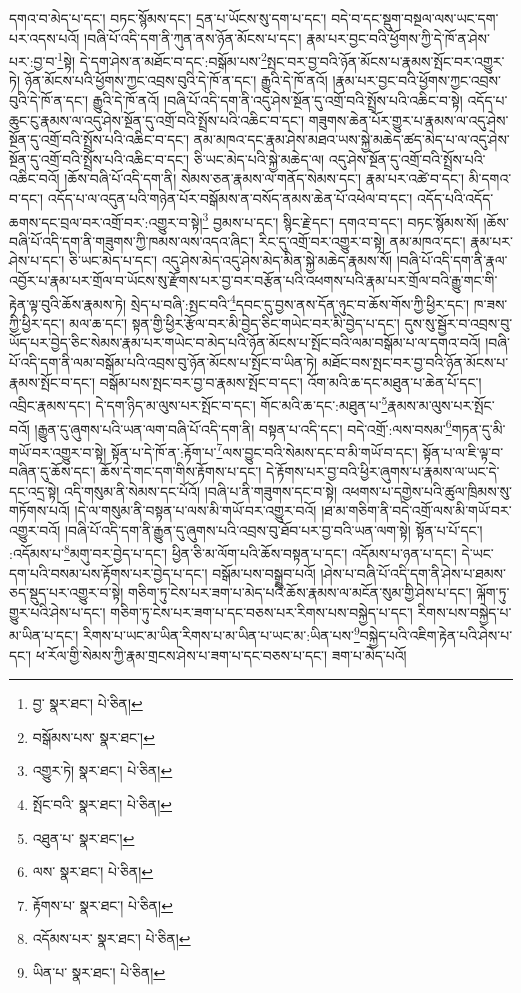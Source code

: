 དགའ་བ་མེད་པ་དང་། བཏང་སྙོམས་དང་། དྲན་པ་ཡོངས་སུ་དག་པ་དང་། བདེ་བ་དང་སྡུག་བསྔལ་ལས་ཡང་དག་པར་འདས་པའོ། །བཞི་པོ་འདི་དག་ནི་ཀུན་ནས་ཉོན་མོངས་པ་དང་། རྣམ་པར་བྱང་བའི་ཕྱོགས་ཀྱི་དེ་ཁོ་ན་ཤེས་པར་:བྱ་བ་\footnote{བྱ་  སྣར་ཐང་།  པེ་ཅིན། }སྟེ། དེ་དག་ཤེས་ན་མཐོང་བ་དང་:བསྒོམ་པས་\footnote{བསྒོམས་པས་  སྣར་ཐང་། }སྤང་བར་བྱ་བའི་ཉོན་མོངས་པ་རྣམས་སྤོང་བར་འགྱུར་ཏེ། ཉོན་མོངས་པའི་ཕྱོགས་ཀྱང་འབྲས་བུའི་དེ་ཁོ་ན་དང་། རྒྱུའི་དེ་ཁོ་ནའོ། །རྣམ་པར་བྱང་བའི་ཕྱོགས་ཀྱང་འབྲས་བུའི་དེ་ཁོ་ན་དང་། རྒྱུའི་དེ་ཁོ་ནའོ། །བཞི་པོ་འདི་དག་ནི་འདུ་ཤེས་སྔོན་དུ་འགྲོ་བའི་སྤྲོས་པའི་འཆིང་བ་སྟེ། འདོད་པ་ཆུང་ངུ་རྣམས་ལ་འདུ་ཤེས་སྔོན་དུ་འགྲོ་བའི་སྤྲོས་པའི་འཆིང་བ་དང་། གཟུགས་ཆེན་པོར་གྱུར་པ་རྣམས་ལ་འདུ་ཤེས་སྔོན་དུ་འགྲོ་བའི་སྤྲོས་པའི་འཆིང་བ་དང་། ནམ་མཁའ་དང་རྣམ་ཤེས་མཐའ་ཡས་སྐྱེ་མཆེད་ཚད་མེད་པ་ལ་འདུ་ཤེས་སྔོན་དུ་འགྲོ་བའི་སྤྲོས་པའི་འཆིང་བ་དང་། ཅི་ཡང་མེད་པའི་སྐྱེ་མཆེད་ལ། འདུ་ཤེས་སྔོན་དུ་འགྲོ་བའི་སྤྲོས་པའི་འཆིང་བའོ། །ཆོས་བཞི་པོ་འདི་དག་ནི། སེམས་ཅན་རྣམས་ལ་གནོད་སེམས་དང་། རྣམ་པར་འཚེ་བ་དང་། མི་དགའ་བ་དང་། འདོད་པ་ལ་འདུན་པའི་གཉེན་པོར་བསྒོམས་ན་བསོད་ནམས་ཆེན་པོ་འཕེལ་བ་དང་། འདོད་པའི་འདོད་ཆགས་དང་བྲལ་བར་འགྲོ་བར་:འགྱུར་བ་སྟེ།\footnote{འགྱུར་ཏེ།  སྣར་ཐང་།  པེ་ཅིན། } བྱམས་པ་དང་། སྙིང་རྗེ་དང་། དགའ་བ་དང་། བཏང་སྙོམས་སོ། །ཆོས་བཞི་པོ་འདི་དག་ནི་གཟུགས་ཀྱི་ཁམས་ལས་འདའ་ཞིང་། རིང་དུ་འགྲོ་བར་འགྱུར་བ་སྟེ། ནམ་མཁའ་དང་། རྣམ་པར་ཤེས་པ་དང་། ཅི་ཡང་མེད་པ་དང་། འདུ་ཤེས་མེད་འདུ་ཤེས་མེད་མིན་སྐྱེ་མཆེད་རྣམས་སོ། །བཞི་པོ་འདི་དག་ནི་རྣལ་འབྱོར་པ་རྣམ་པར་གྲོལ་བ་ཡོངས་སུ་རྫོགས་པར་བྱ་བར་བརྩོན་པའི་འཕགས་པའི་རྣམ་པར་གྲོལ་བའི་རྒྱུ་གང་གི་རྟེན་ལྟ་བུའི་ཆོས་རྣམས་ཏེ། སྲེད་པ་བཞི་:སྤང་བའི་\footnote{སྤོང་བའི་  སྣར་ཐང་།  པེ་ཅིན། }དབང་དུ་བྱས་ནས་དོན་ཉུང་བ་ཆོས་གོས་ཀྱི་ཕྱིར་དང་། ཁ་ཟས་ཀྱི་ཕྱིར་དང་། མལ་ཆ་དང་། སྟན་གྱི་ཕྱིར་རྩོལ་བར་མི་བྱེད་ཅིང་གཡེང་བར་མི་བྱེད་པ་དང་། དུས་སུ་སྦྱོར་བ་འབྲས་བུ་ཡོད་པར་བྱེད་ཅིང་སེམས་རྣམ་པར་གཡེང་བ་མེད་པའི་ཉོན་མོངས་པ་སྤོང་བའི་ལམ་བསྒོམ་པ་ལ་དགའ་བའོ། །བཞི་པོ་འདི་དག་ནི་ལམ་བསྒོམ་པའི་འབྲས་བུ་ཉོན་མོངས་པ་སྤོང་བ་ཡིན་ཏེ། མཐོང་བས་སྤང་བར་བྱ་བའི་ཉོན་མོངས་པ་རྣམས་སྤོང་བ་དང་། བསྒོམ་པས་སྤང་བར་བྱ་བ་རྣམས་སྤོང་བ་དང་། འོག་མའི་ཆ་དང་མཐུན་པ་ཆེན་པོ་དང་། འབྲིང་རྣམས་དང་། དེ་དག་ཉིད་མ་ལུས་པར་སྤོང་བ་དང་། གོང་མའི་ཆ་དང་:མཐུན་པ་\footnote{འཐུན་པ་  སྣར་ཐང་། }རྣམས་མ་ལུས་པར་སྤོང་བའོ། །རྒྱུན་དུ་ཞུགས་པའི་ཡན་ལག་བཞི་པོ་འདི་དག་ནི། བསྟན་པ་འདི་དང་། བདེ་འགྲོ་:ལས་བསམ་\footnote{ལས་  སྣར་ཐང་།  པེ་ཅིན། }གཏན་དུ་མི་གཡོ་བར་འགྱུར་བ་སྟེ། སྟོན་པ་དེ་ཁོ་ན་:རྟོག་པ་\footnote{རྟོགས་པ་  སྣར་ཐང་།  པེ་ཅིན། }ལས་བྱུང་བའི་སེམས་དང་བ་མི་གཡོ་བ་དང་། སྟོན་པ་ལ་ཇི་ལྟ་བ་བཞིན་དུ་ཆོས་དང་། ཆོས་དེ་གང་དག་གིས་རྟོགས་པ་དང་། དེ་རྟོགས་པར་བྱ་བའི་ཕྱིར་ཞུགས་པ་རྣམས་ལ་ཡང་དེ་དང་འདྲ་སྟེ། འདི་གསུམ་ནི་སེམས་དང་པོའོ། །བཞི་པ་ནི་གཟུགས་དང་བ་སྟེ། འཕགས་པ་དགྱེས་པའི་ཚུལ་ཁྲིམས་སུ་གཏོགས་པའོ། །དེ་ལ་གསུམ་ནི་བསྟན་པ་ལས་མི་གཡོ་བར་འགྱུར་བའོ། །ཐ་མ་གཅིག་ནི་བདེ་འགྲོ་ལས་མི་གཡོ་བར་འགྱུར་བའོ། །བཞི་པོ་འདི་དག་ནི་རྒྱུན་དུ་ཞུགས་པའི་འབྲས་བུ་ཐོབ་པར་བྱ་བའི་ཡན་ལག་སྟེ། སྟོན་པ་པོ་དང་། :འདོམས་པ་\footnote{འདོམས་པར་  སྣར་ཐང་།  པེ་ཅིན། }མགུ་བར་བྱེད་པ་དང་། ཕྱིན་ཅི་མ་ལོག་པའི་ཆོས་བསྟན་པ་དང་། འདོམས་པ་ཉན་པ་དང་། དེ་ཡང་དག་པའི་བསམ་པས་རྟོགས་པར་བྱེད་པ་དང་། བསྒོམ་པས་བསྒྲུབ་པའོ། །ཤེས་པ་བཞི་པོ་འདི་དག་ནི་ཤེས་པ་ཐམས་ཅད་སྡུད་པར་འགྱུར་བ་སྟེ། གཅིག་ཏུ་ངེས་པར་ཟག་པ་མེད་པའི་ཆོས་རྣམས་ལ་མངོན་སུམ་གྱི་ཤེས་པ་དང་། ལྐོག་ཏུ་གྱུར་པའི་ཤེས་པ་དང་། གཅིག་ཏུ་ངེས་པར་ཟག་པ་དང་བཅས་པར་རིགས་པས་བསྐྱེད་པ་དང་། རིགས་པས་བསྐྱེད་པ་མ་ཡིན་པ་དང་། རིགས་པ་ཡང་མ་ཡིན་རིགས་པ་མ་ཡིན་པ་ཡང་མ་:ཡིན་པས་\footnote{ཡིན་པ་  སྣར་ཐང་།  པེ་ཅིན། }བསྐྱེད་པའི་འཇིག་རྟེན་པའི་ཤེས་པ་དང་། ཕ་རོལ་གྱི་སེམས་ཀྱི་རྣམ་གྲངས་ཤེས་པ་ཟག་པ་དང་བཅས་པ་དང་། ཟག་པ་མེད་པའོ། 